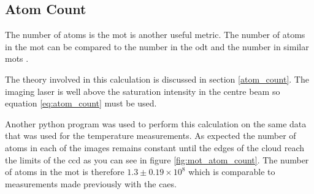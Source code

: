 \subsection{Atom Count}
\label{mot_atom_count}
The number of atoms is the \gls{mot} is another useful metric. The number of atoms in the \gls{mot} can be compared to the number in the \gls{odt} and the number in similar \glspl{mot} .

The theory involved in this calculation is discussed in section \ref{atom_count}. The imaging laser is well above the saturation intensity in the centre beam so equation \ref{eq:atom_count} must be used.

Another python program was used to perform this calculation on the same data that was used for the temperature measurements. As expected the number of atoms in each of the images remains constant until the edges of the cloud reach the limits of the \gls{ccd} as you can see in figure \ref{fig:mot_atom_count}. The number of atoms in the \gls{mot} is therefore $1.3 \pm0.19\times10^8$ which is comparable to measurements made previously with the \gls{caes}\cite{sheludko_shaped_2010}.

